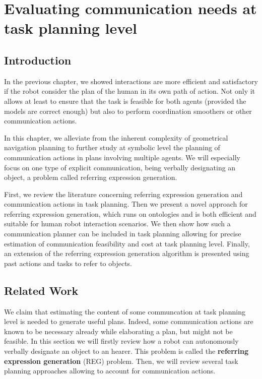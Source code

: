\documentclass[a4paper,11pt,twoside]{StyleThese}
\begin{document}
\setcounter{chapter}{2} %
\dominitoc
\faketableofcontents
\fi

\chapter{Evaluating communication needs at task planning level}
\minitoc
\printnomenclature

\section{Introduction}
In the previous chapter, we showed interactions are more efficient and satisfactory if the robot consider the plan of the human in its own path of action. Not only it allows at least to ensure that the task is feasible for both agents (provided the models are correct enough) but also to perform coordination smoothers or other communication actions.

In this chapter, we alleviate from the inherent complexity of geometrical navigation planning to further study at symbolic level the planning of communication actions in plans involving multiple agents. We will especially focus on one type of explicit communication, being verbally designating an object, a problem called referring expression generation.

First, we review the literature concerning referring expression generation and communication actions in task planning. Then we present a novel approach for referring expression generation, which runs on ontologies and is both efficient and suitable for human robot interaction scenarios. We then show how such a communication planner can be included in task planning allowing for precise estimation of communication feasibility and cost at task planning level. Finally, an extension of the referring expression generation algorithm is presented using past actions and tasks to refer to objects.

\section{Related Work}
We claim that estimating the content of some communcation at task planning level is needed to generate useful plans. Indeed, some communication actions are known to be necessary already while elaborating a plan, but might not be feasible.
In this section we will firstly review how a robot can autonomously verbally designate an object to an hearer. This problem is called the \textbf{referring expression generation} (REG) problem.
Then, we will review several task planning approaches allowing to account for communication actions.
\end{document}
